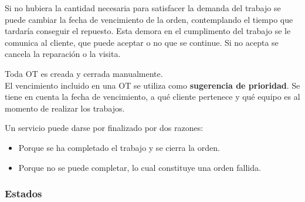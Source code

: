 \documentclass[12pt]{extarticle}
\begin{document}
\begin{spacing}{1.2}
        Si no hubiera la cantidad necesaria para satisfacer la demanda del trabajo se puede cambiar la fecha de vencimiento de la orden, contemplando el tiempo que tardaría conseguir el repuesto. Esta demora en el cumplimento del trabajo se le comunica al cliente, que puede aceptar o no que se continue. Si no acepta se cancela la reparación o la visita.

        Toda OT es creada y cerrada manualmente.\\

        El vencimiento incluido en una OT se utiliza como \textbf{sugerencia de prioridad}. Se tiene en cuenta la fecha de vencimiento, a qué cliente pertenece y qué equipo es al momento de realizar los trabajos. 

        Un servicio puede darse por finalizado por dos razones:
        \begin{itemize}
            \item Porque se ha completado el trabajo y se cierra la orden.
            \item Porque no se puede completar, lo cual constituye una orden fallida.
        \end{itemize}

        \subsubsection{Estados}


\end{spacing}
\end{document}
